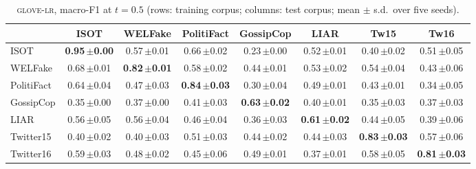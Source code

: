 \begin{table}[h]
\centering
\caption{\textsc{glove-lr}, macro-F1 at $t=0.5$ (rows: training corpus; columns: test corpus; mean $\pm$ s.d.\ over five seeds).}
\scriptsize
\begin{tabular}{@{}lccccccc@{}}
\toprule
 & ISOT & WELFake & PolitiFact & GossipCop & LIAR & Tw15 & Tw16 \\
\midrule
ISOT & \textbf{0.95\,{\tiny$\pm$0.00}} & 0.57\,{\tiny$\pm$0.01} & 0.66\,{\tiny$\pm$0.02} & 0.23\,{\tiny$\pm$0.00} & 0.52\,{\tiny$\pm$0.01} & 0.40\,{\tiny$\pm$0.02} & 0.51\,{\tiny$\pm$0.05} \\
WELFake & 0.68\,{\tiny$\pm$0.01} & \textbf{0.82\,{\tiny$\pm$0.01}} & 0.58\,{\tiny$\pm$0.02} & 0.44\,{\tiny$\pm$0.01} & 0.53\,{\tiny$\pm$0.02} & 0.54\,{\tiny$\pm$0.04} & 0.43\,{\tiny$\pm$0.06} \\
PolitiFact & 0.64\,{\tiny$\pm$0.04} & 0.47\,{\tiny$\pm$0.03} & \textbf{0.84\,{\tiny$\pm$0.03}} & 0.30\,{\tiny$\pm$0.04} & 0.49\,{\tiny$\pm$0.01} & 0.43\,{\tiny$\pm$0.01} & 0.34\,{\tiny$\pm$0.05} \\
GossipCop & 0.35\,{\tiny$\pm$0.00} & 0.37\,{\tiny$\pm$0.00} & 0.41\,{\tiny$\pm$0.03} & \textbf{0.63\,{\tiny$\pm$0.02}} & 0.40\,{\tiny$\pm$0.01} & 0.35\,{\tiny$\pm$0.03} & 0.37\,{\tiny$\pm$0.03} \\
LIAR & 0.56\,{\tiny$\pm$0.05} & 0.56\,{\tiny$\pm$0.04} & 0.46\,{\tiny$\pm$0.04} & 0.36\,{\tiny$\pm$0.03} & \textbf{0.61\,{\tiny$\pm$0.02}} & 0.44\,{\tiny$\pm$0.05} & 0.39\,{\tiny$\pm$0.06} \\
Twitter15 & 0.40\,{\tiny$\pm$0.02} & 0.40\,{\tiny$\pm$0.03} & 0.51\,{\tiny$\pm$0.03} & 0.44\,{\tiny$\pm$0.02} & 0.44\,{\tiny$\pm$0.03} & \textbf{0.83\,{\tiny$\pm$0.03}} & 0.57\,{\tiny$\pm$0.06} \\
Twitter16 & 0.59\,{\tiny$\pm$0.03} & 0.48\,{\tiny$\pm$0.02} & 0.45\,{\tiny$\pm$0.06} & 0.49\,{\tiny$\pm$0.01} & 0.37\,{\tiny$\pm$0.01} & 0.58\,{\tiny$\pm$0.05} & \textbf{0.81\,{\tiny$\pm$0.03}} \\
\bottomrule
\end{tabular}
\end{table}

